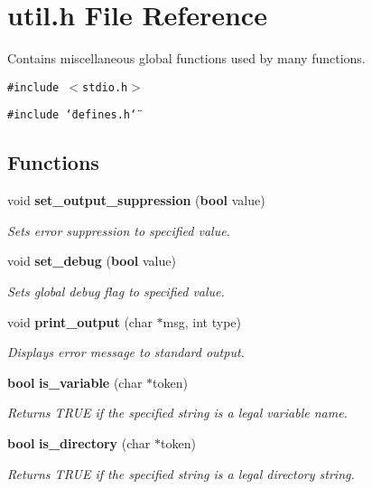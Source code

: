 \section{util.h File Reference}
\label{util_8h}
Contains miscellaneous global functions used by many functions. 


{\tt \#include $<$stdio.h$>$}\par
{\tt \#include \char`\"{}defines.h\char`\"{}}\par
\subsection*{Functions}
\begin{CompactItemize}
\item 
void {\bf set\_\-output\_\-suppression} ({\bf bool} value)
\begin{CompactList}\small\item\em Sets error suppression to specified value.\item\end{CompactList}\item 
void {\bf set\_\-debug} ({\bf bool} value)
\begin{CompactList}\small\item\em Sets global debug flag to specified value.\item\end{CompactList}\item 
void {\bf print\_\-output} (char $\ast$msg, int type)
\begin{CompactList}\small\item\em Displays error message to standard output.\item\end{CompactList}\item 
{\bf bool} {\bf is\_\-variable} (char $\ast$token)
\begin{CompactList}\small\item\em Returns TRUE if the specified string is a legal variable name.\item\end{CompactList}\item 
{\bf bool} {\bf is\_\-directory} (char $\ast$token)
\begin{CompactList}\small\item\em Returns TRUE if the specified string is a legal directory string.\item\end{CompactList}\item 

\end{CompactItemize}
